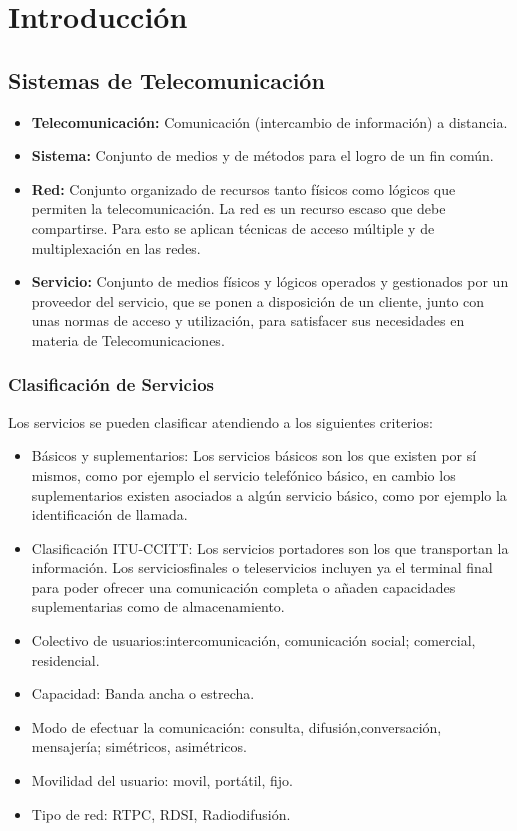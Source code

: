 \section{Introducción}
\subsection{Sistemas de Telecomunicación}
\begin{itemize}
\item\textbf{Telecomunicación:} Comunicación (intercambio de información) a distancia.
\item\textbf{Sistema:} Conjunto de medios y de métodos para el logro de un fin común.
\item\textbf{Red:} Conjunto organizado de recursos tanto físicos como lógicos que permiten la telecomunicación. La red es un recurso escaso que debe compartirse. Para esto se aplican técnicas de acceso múltiple y de multiplexación en las redes.
\item\textbf{Servicio:} Conjunto de medios físicos y lógicos operados y gestionados por un proveedor del servicio, que se ponen a disposición de un cliente, junto con unas normas de acceso y utilización, para satisfacer sus necesidades en materia de Telecomunicaciones.
\end{itemize}
\subsubsection{Clasificación de Servicios}
Los servicios se pueden clasificar atendiendo a los siguientes criterios:
\begin{itemize}
\item Básicos y suplementarios: Los servicios básicos son los que existen por sí mismos, como por ejemplo el servicio telefónico básico, en cambio los suplementarios existen asociados a algún servicio básico, como por ejemplo la identificación de llamada.
\item Clasificación ITU-CCITT: Los servicios portadores son los que transportan la información. Los serviciosfinales o teleservicios incluyen ya el terminal final para poder ofrecer una comunicación completa o añaden capacidades suplementarias como de almacenamiento.
\item Colectivo de usuarios:intercomunicación, comunicación social; comercial, residencial.
\item Capacidad: Banda ancha o estrecha.
\item Modo de efectuar la comunicación: consulta, difusión,conversación, mensajería; simétricos, asimétricos.
\item Movilidad del usuario: movil, portátil, fijo.
\item Tipo de red: RTPC, RDSI, Radiodifusión.
\end{itemize}
